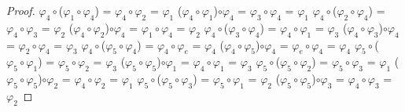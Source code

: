 \documentclass[10pt,a4paper,oneside]{article}
\begin{document}
\begin{proof}
					$\varphi_{4}\circ$($\varphi_{1}\circ\varphi_{4}$) = $\varphi_{4}\circ\varphi_{2}$ = $\varphi_{1}$
					\newline
					($\varphi_{4}\circ\varphi_{1}$)$\circ\varphi_{4}$ = $\varphi_{3}\circ\varphi_{4}$ = $\varphi_{1}$
					\newline
					\newline
					$\varphi_{4}\circ$($\varphi_{2}\circ\varphi_{4}$) = $\varphi_{4}\circ\varphi_{3}$ = $\varphi_{2}$
					\newline
					($\varphi_{4}\circ\varphi_{2}$)$\circ\varphi_{4}$ = $\varphi_{1}\circ\varphi_{4}$ = $\varphi_{2}$
					\newline
					\newline
					$\varphi_{4}\circ$($\varphi_{3}\circ\varphi_{4}$) = $\varphi_{4}\circ\varphi_{1}$ = $\varphi_{3}$
					\newline
					($\varphi_{4}\circ\varphi_{3}$)$\circ\varphi_{4}$ = $\varphi_{2}\circ\varphi_{4}$ = $\varphi_{3}$
					\newline
					\newline
					$\varphi_{4}\circ$($\varphi_{5}\circ\varphi_{4}$) = $\varphi_{4}\circ\varphi_{e}$ = $\varphi_{4}$
					\newline
					($\varphi_{4}\circ\varphi_{5}$)$\circ\varphi_{4}$ = $\varphi_{e}\circ\varphi_{4}$ = $\varphi_{4}$
					\newline
					\newline
					$\varphi_{5}\circ$($\varphi_{5}\circ\varphi_{1}$) = $\varphi_{5}\circ\varphi_{2}$ = $\varphi_{3}$
					\newline
					($\varphi_{5}\circ\varphi_{5}$)$\circ\varphi_{1}$ = $\varphi_{4}\circ\varphi_{1}$ = $\varphi_{3}$
					\newline
					\newline
					$\varphi_{5}\circ$($\varphi_{5}\circ\varphi_{2}$) = $\varphi_{5}\circ\varphi_{3}$ = $\varphi_{1}$
					\newline
					($\varphi_{5}\circ\varphi_{5}$)$\circ\varphi_{2}$ = $\varphi_{4}\circ\varphi_{2}$ = $\varphi_{1}$
					\newline
					\newline
					$\varphi_{5}\circ$($\varphi_{5}\circ\varphi_{3}$) = $\varphi_{5}\circ\varphi_{1}$ = $\varphi_{2}$
					\newline
					($\varphi_{5}\circ\varphi_{5}$)$\circ\varphi_{3}$ = $\varphi_{4}\circ\varphi_{3}$ = $\varphi_{2}$
					\newline
					\newline

\end{proof}
\end{document}
